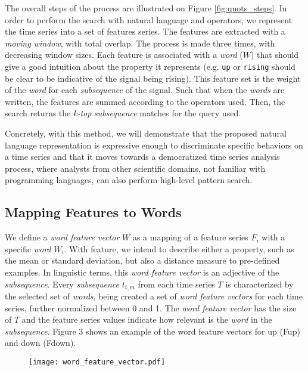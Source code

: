 {The overall steps of the process are illustrated on Figure \ref{fig:quots_steps}. In order to perform the search with natural language and operators, we represent the time series into a set of features series. The features are extracted with a \textit{moving window}, with total overlap. The process is made three times, with decreasing window sizes. Each feature is associated with a \textit{word} ($W$) that should give a good intuition about the property it represents (e.g. \texttt{up} or \texttt{rising} should be clear to be indicative of the signal being rising). This feature set is the weight of the \textit{word} for each \textit{subsequence} of the signal. Such that when the \textit{words} are written, the features are summed according to the operators used. Then, the search returns the \textit{k-top} \textit{subsequence} matches for the query used.
\par
Concretely, with this method, we will demonstrate that the proposed natural language representation is expressive enough to discriminate specific behaviors on a time series and that it moves towards a democratized time series analysis process, where analysts from other scientific domains, not familiar with programming languages, can also perform high-level pattern search.

\subsection{Mapping Features to Words}

We define a \textit{word feature vector} $W$ as a mapping of a feature series $F_i$ with a specific \textit{word} $W_i$. With feature, we intend to describe either a property, such as the mean or standard deviation, but also a distance measure to pre-defined examples. In linguistic terms, this \textit{word feature vector} is an adjective of the \textit{subsequence}. Every \textit{subsequence} $t_{i,m}$ from each time series $T$ is characterized by the selected set of \textit{words},  being created a set of \textit{word feature vectors} for each time series, further normalized between 0 and 1. The \textit{word feature vector} has the size of $T$ and the feature series values indicate how relevant is the \textit{word} in the \textit{subsequence}. Figure 3 shows an example of the word feature vectors for \textcolor{myblue4}{up (Fup)} and \textcolor{myblue3}{down (Fdown)}.

\begin{figure}[!h]
\centering
\texttt{[image: word\_feature\_vector.pdf]}
\label{fig:wfv_example}
\caption{}
\end{figure}


}
